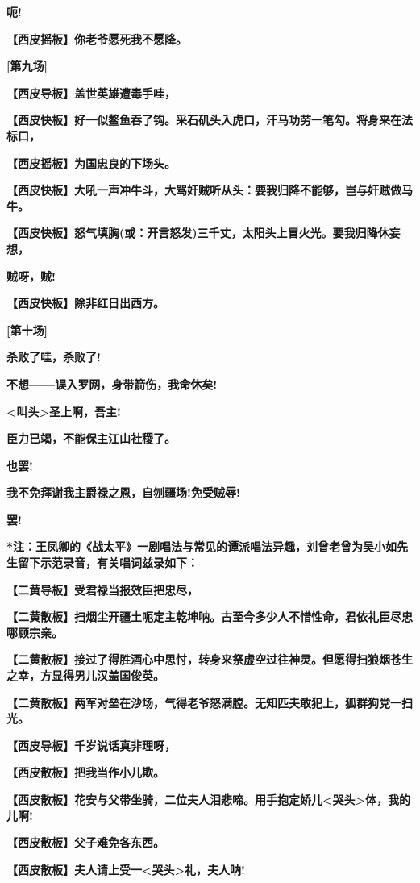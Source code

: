 \textbf{呃!}

\textbf{【西皮摇板】你老爷愿死我不愿降。}

\textbf{{[}第九场{]}}

\textbf{【西皮导板】盖世英雄遭毒手哇，}

\textbf{【西皮快板】好一似鳌鱼吞了钩。采石矶头入虎口，汗马功劳一笔勾。将身来在法标口，}

\textbf{【西皮摇板】为国忠良的下场头。}

\textbf{【西皮快板】大吼一声冲牛斗，大骂奸贼听从头：要我归降不能够，岂与奸贼做马牛。}

\textbf{【西皮快板】怒气填胸(或：开言怒发)三千丈，太阳头上冒火光。要我归降休妄想，}

\textbf{贼呀，贼!}

\textbf{【西皮快板】除非红日出西方。}

\textbf{{[}第十场{]}}

\textbf{杀败了哇，杀败了!}

\textbf{不想------误入罗网，身带箭伤，我命休矣!}

\textbf{\textless{}叫头\textgreater{}圣上啊，吾主!}

\textbf{臣力已竭，不能保主江山社稷了。}

\textbf{也罢!}

\textbf{我不免拜谢我主爵禄之恩，自刎疆场!免受贼辱!}

\textbf{罢!}

\textbf{*注：王凤卿的《战太平》一剧唱法与常见的谭派唱法异趣，刘曾老曾为吴小如先生留下示范录音，有关唱词兹录如下：}

\textbf{【二黄导板】受君禄当报效臣把忠尽，}

\textbf{【二黄散板】扫烟尘开疆土呃定主乾坤呐。古至今多少人不惜性命，君依礼臣尽忠哪顾宗亲。}

\textbf{【二黄散板】接过了得胜酒心中思忖，转身来祭虚空过往神灵。但愿得扫狼烟苍生之幸，方显得男儿汉盖国俊英。}

\textbf{【二黄散板】两军对垒在沙场，气得老爷怒满膛。无知匹夫敢犯上，狐群狗党一扫光。}

\textbf{【西皮导板】千岁说话真非理呀，}

\textbf{【西皮散板】把我当作小儿欺。}

\textbf{【西皮散板】花安与父带坐骑，二位夫人泪悲啼。用手抱定娇儿\textless{}哭头\textgreater{}体，我的儿啊!}

\textbf{【西皮散板】父子难免各东西。}

\textbf{【西皮散板】夫人请上受一\textless{}哭头\textgreater{}礼，夫人呐!}

